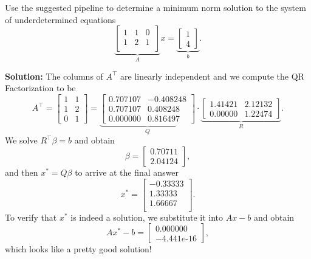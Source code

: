 \begin{example}
\label{ex:QRSolveUnderdetermined} Use the suggested pipeline to determine a minimum norm solution to the system of underdetermined equations
$$\underbrace{\left[ \begin{array}{ccc} 1 & 1 & 0 \
\\ 1 & 2 & 1\\
\end{array} \right]}_{A} x =  
\underbrace{\left[ \begin{array}{c}
1 \\  4 \end{array} \right]}_{b}.$$
\end{example}

\textbf{Solution:} The columns of $A^\top$ are linearly independent and we compute the QR Factorization to be
$$A^\top = \left[ \begin{array}{cc} 1 & 1\\ 
1 & 2\\
0 & 1
\end{array} \right] =  \underbrace{\left[ \begin{array}{rr}
 0.707107 & -0.408248 \\
 0.707107  & 0.408248  \\
 0.000000      &  0.816497
 \end{array} \right]}_{Q} \cdot
  \underbrace{\left[ \begin{array}{rr}
 1.41421  &    2.12132 \\
 0.00000 & 1.22474
 \end{array} \right]}_{R}.
$$
We solve $R^\top \beta = b$ and obtain 
$$ \beta = \left[ \begin{array}{r}
 0.70711 \\
 2.04124
  \end{array} \right],$$
  and then $x^\ast = Q \beta$ to arrive at the final answer
  $$x^\ast = \left[ \begin{array}{r}
 -0.33333 \\
  1.33333  \\
  1.66667 \\ 
  \end{array} \right]. $$
  To verify that $x^\ast$ is indeed a solution, we substitute it into  $Ax-b $ and obtain
  $$Ax^\ast -b =  \left[ \begin{array}{r}
     0.000000~~\\
 -4.441 e\mbox{-}16
  \end{array} \right],$$
which looks like a pretty good solution! 
\Qed

